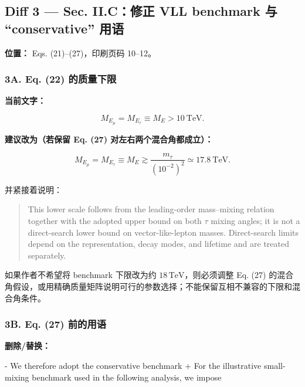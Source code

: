 \documentclass[
]{article}
\newenvironment{Shaded}{}{}
\newcommand{\StringTok}[1]{\textcolor[rgb]{0.25,0.44,0.63}{#1}}
\newcommand{\VariableTok}[1]{\textcolor[rgb]{0.10,0.09,0.49}{#1}}
\begin{document}
\subsection{Diff 3 --- Sec. II.C：修正 VLL benchmark 与 ``conservative''
用语}\label{diff-3-sec.-ii.cux4feeux6b63-vll-benchmark-ux4e0e-conservative-ux7528ux8bed}

\textbf{位置：} Eqs. (21)--(27)，印刷页码 10--12。

\subsubsection{3A. Eq. (22)
的质量下限}\label{a.-eq.-22-ux7684ux8d28ux91cfux4e0bux9650}

\textbf{当前文字：}

\begin{equation}
M_{E_\mu}=M_{E_\tau}\equiv M_E>10~\mathrm{TeV}.
\end{equation}

\textbf{建议改为（若保留 Eq. (27) 对左右两个混合角都成立）：}

\[
M_{E_\mu}=M_{E_\tau}\equiv M_E
\gtrsim \frac{m_\tau}{(10^{-2})^2}
\simeq 17.8~\mathrm{TeV}.
\]

并紧接着说明：

\begin{quote}
This lower scale follows from the leading-order mass--mixing relation
together with the adopted upper bound on both \(\tau\) mixing angles; it
is not a direct-search lower bound on vector-like-lepton masses.
Direct-search limits depend on the representation, decay modes, and
lifetime and are treated separately.
\end{quote}

如果作者不希望将 benchmark 下限改为约 \(18\,\mathrm{TeV}\)，则必须调整
Eq. (27)
的混合角假设，或用精确质量矩阵说明可行的参数选择；不能保留互相不兼容的下限和混合角条件。

\subsubsection{3B. Eq. (27)
前的用语}\label{b.-eq.-27-ux524dux7684ux7528ux8bed}

\textbf{删除/替换：}

\begin{Shaded}
\begin{Highlighting}[]
\StringTok{{-} We therefore adopt the conservative benchmark}
\VariableTok{+ For the illustrative small{-}mixing benchmark used in the following analysis, we impose}
\end{Highlighting}
\end{Shaded}
\end{document}

